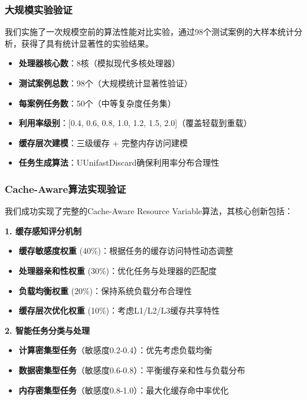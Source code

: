 \subsubsection{大规模实验验证}

我们实施了一次规模空前的算法性能对比实验，通过98个测试案例的大样本统计分析，获得了具有统计显著性的实验结果。

\begin{tcolorbox}[
    colback=green!5!white,
    colframe=green!50!black,
    title=\textbf{实验配置参数},
    fonttitle=\bfseries,
    arc=3pt
]
\begin{itemize}
    \item \textbf{处理器核心数}：8核（模拟现代多核处理器）
    \item \textbf{测试案例总数}：98个（大规模统计显著性验证）
    \item \textbf{每案例任务数}：50个（中等复杂度任务集）
    \item \textbf{利用率级别}：[0.4, 0.6, 0.8, 1.0, 1.2, 1.5, 2.0]（覆盖轻载到重载）
    \item \textbf{缓存层次建模}：三级缓存 + 完整内存访问建模
    \item \textbf{任务生成算法}：UUnifastDiscard确保利用率分布合理性
\end{itemize}
\end{tcolorbox}

\subsubsection{Cache-Aware算法实现验证}

我们成功实现了完整的Cache-Aware Resource Variable算法，其核心创新包括：

\textbf{1. 缓存感知评分机制}
\begin{tcolorbox}[
    colback=lightblue!10!white,
    colframe=blue!50!black,
    arc=3pt
]
\begin{itemize}
    \item \textbf{缓存敏感度权重} (40\%)：根据任务的缓存访问特性动态调整
    \item \textbf{处理器亲和性权重} (30\%)：优化任务与处理器的匹配度
    \item \textbf{负载均衡权重} (20\%)：保持系统负载分布合理性
    \item \textbf{缓存层次优化权重} (10\%)：考虑L1/L2/L3缓存共享特性
\end{itemize}
\end{tcolorbox}

\textbf{2. 智能任务分类与处理}
\begin{tcolorbox}[
    colback=orange!10!white,
    colframe=orange!50!black,
    arc=3pt
]
\begin{itemize}
    \item \textbf{计算密集型任务}（敏感度0.2-0.4）：优先考虑负载均衡
    \item \textbf{数据密集型任务}（敏感度0.6-0.8）：平衡缓存亲和性与负载分布  
    \item \textbf{内存密集型任务}（敏感度0.8-1.0）：最大化缓存命中率优化
\end{itemize}
\end{tcolorbox}

